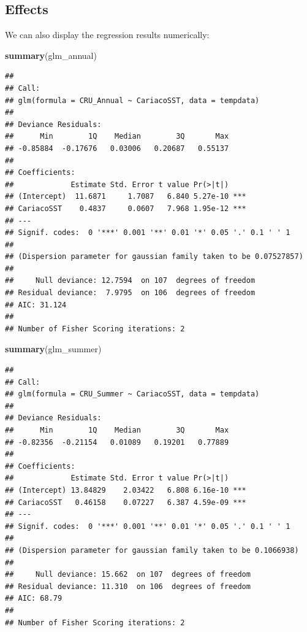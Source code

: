 \documentclass[]{article}
\newenvironment{Shaded}{\begin{snugshade}}{\end{snugshade}}
\newcommand{\KeywordTok}[1]{\textcolor[rgb]{0.13,0.29,0.53}{\textbf{#1}}}
\newcommand{\NormalTok}[1]{#1}
\begin{document}
\subsection{Effects}\label{effects}

We can also display the regression results numerically:

\begin{Shaded}
\begin{Highlighting}[]
\KeywordTok{summary}\NormalTok{(glm_annual)}
\end{Highlighting}
\end{Shaded}

\begin{verbatim}
## 
## Call:
## glm(formula = CRU_Annual ~ CariacoSST, data = tempdata)
## 
## Deviance Residuals: 
##      Min        1Q    Median        3Q       Max  
## -0.85884  -0.17676   0.03006   0.20687   0.55137  
## 
## Coefficients:
##             Estimate Std. Error t value Pr(>|t|)    
## (Intercept)  11.6871     1.7087   6.840 5.27e-10 ***
## CariacoSST    0.4837     0.0607   7.968 1.95e-12 ***
## ---
## Signif. codes:  0 '***' 0.001 '**' 0.01 '*' 0.05 '.' 0.1 ' ' 1
## 
## (Dispersion parameter for gaussian family taken to be 0.07527857)
## 
##     Null deviance: 12.7594  on 107  degrees of freedom
## Residual deviance:  7.9795  on 106  degrees of freedom
## AIC: 31.124
## 
## Number of Fisher Scoring iterations: 2
\end{verbatim}

\begin{Shaded}
\begin{Highlighting}[]
\KeywordTok{summary}\NormalTok{(glm_summer)}
\end{Highlighting}
\end{Shaded}

\begin{verbatim}
## 
## Call:
## glm(formula = CRU_Summer ~ CariacoSST, data = tempdata)
## 
## Deviance Residuals: 
##      Min        1Q    Median        3Q       Max  
## -0.82356  -0.21154   0.01089   0.19201   0.77889  
## 
## Coefficients:
##             Estimate Std. Error t value Pr(>|t|)    
## (Intercept) 13.84829    2.03422   6.808 6.16e-10 ***
## CariacoSST   0.46158    0.07227   6.387 4.59e-09 ***
## ---
## Signif. codes:  0 '***' 0.001 '**' 0.01 '*' 0.05 '.' 0.1 ' ' 1
## 
## (Dispersion parameter for gaussian family taken to be 0.1066938)
## 
##     Null deviance: 15.662  on 107  degrees of freedom
## Residual deviance: 11.310  on 106  degrees of freedom
## AIC: 68.79
## 
## Number of Fisher Scoring iterations: 2
\end{verbatim}
\end{document}

